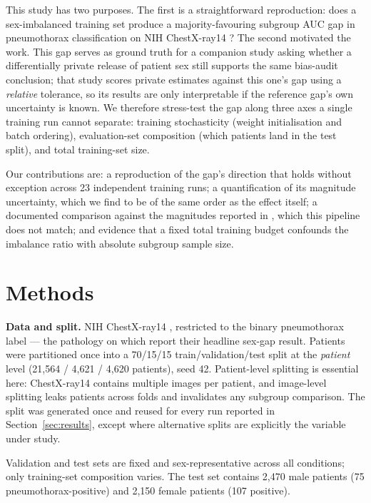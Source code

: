 \documentclass[11pt]{article}
\begin{document}
This study has two purposes. The first is a straightforward reproduction: does a sex-imbalanced training set produce a majority-favouring subgroup AUC gap in pneumothorax classification on NIH ChestX-ray14 \cite{wang2017}? The second motivated the work. This gap serves as ground truth for a companion study asking whether a differentially private release of patient sex still supports the same bias-audit conclusion; that study scores private estimates against this one's gap using a \emph{relative} tolerance, so its results are only interpretable if the reference gap's own uncertainty is known. We therefore stress-test the gap along three axes a single training run cannot separate: training stochasticity (weight initialisation and batch ordering), evaluation-set composition (which patients land in the test split), and total training-set size.

Our contributions are: a reproduction of the gap's direction that holds without exception across 23 independent training runs; a quantification of its magnitude uncertainty, which we find to be of the same order as the effect itself; a documented comparison against the magnitudes reported in \cite{larrazabal2020}, which this pipeline does not match; and evidence that a fixed total training budget confounds the imbalance ratio with absolute subgroup sample size.

\section{Methods}

\textbf{Data and split.} NIH ChestX-ray14 \cite{wang2017}, restricted to the binary pneumothorax label --- the pathology on which \cite{larrazabal2020} report their headline sex-gap result. Patients were partitioned once into a 70/15/15 train/validation/test split at the \emph{patient} level (21,564 / 4,621 / 4,620 patients), seed 42. Patient-level splitting is essential here: ChestX-ray14 contains multiple images per patient, and image-level splitting leaks patients across folds and invalidates any subgroup comparison. The split was generated once and reused for every run reported in Section~\ref{sec:results}, except where alternative splits are explicitly the variable under study.

Validation and test sets are fixed and sex-representative across all conditions; only training-set composition varies. The test set contains 2,470 male patients (75 pneumothorax-positive) and 2,150 female patients (107 positive).
\end{document}
